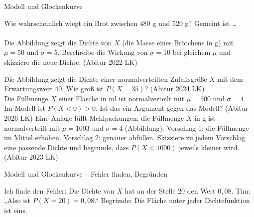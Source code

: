 \setcounter{aufgabe}{7}

\begin{aufgabe}{Modell und Glockenkurve}
\begin{teile}
\teil Wie wahrscheinlich wiegt ein Brot zwischen $480$ g und $520$ g? Gemeint ist … \\  \\ 
\teil Die Abbildung zeigt die Dichte von $X$ (die Masse eines Brötchens in g) mit $\mu = 50$ und $\sigma = 5$. Beschreibe die Wirkung von $\sigma = 10$ bei gleichem $\mu$ und skizziere die neue Dichte. \hfill (Abitur 2022 LK)

\teil Die Abbildung zeigt die Dichte einer normalverteilten Zufallsgröße $X$ mit dem Erwartungswert $40$. Wie groß ist $P(X = 35)$? \hfill (Abitur 2024 LK) \\

\leerfeld
\teil Die Füllmenge $X$ einer Flasche in ml ist normalverteilt mit $\mu = 500$ und $\sigma = 4$. Im Modell ist $P(X < 0) > 0$. Ist das ein Argument gegen das Modell? \hfill (Abitur 2026 LK)
\teil Eine Anlage füllt Mehlpackungen; die Füllmenge $X$ in g ist normalverteilt mit $\mu = 1003$ und $\sigma = 4$ (Abbildung). Vorschlag 1: die Füllmenge im Mittel erhöhen. Vorschlag 2: genauer abfüllen. Skizziere zu jedem Vorschlag eine passende Dichte und begründe, dass $P(X < 1000)$ jeweils kleiner wird. \hfill (Abitur 2023 LK)

\end{teile}
\end{aufgabe}

\begin{aufgabe}{Modell und Glockenkurve – Fehler finden, Begründen}
\begin{teile}
\teil Ich finde den Fehler: Die Dichte von $X$ hat an der Stelle $20$ den Wert $0{,}08$. Tim: „Also ist $P(X = 20) = 0{,}08$.“
\teil Begründe: Die Fläche unter jeder Dichtefunktion ist eins.
\end{teile}
\end{aufgabe}
